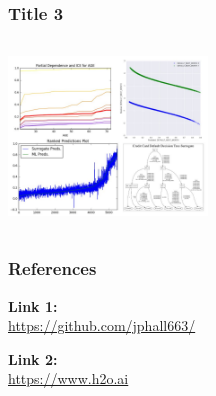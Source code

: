 \documentclass[11pt,
               		aspectratio=169,
               		hyperref={colorlinks}
               		]{beamer}
\begin{document}
		\subsection*{}
		
		\begin{frame}
		
			\frametitle{Title 3}		
			
			\begin{columns}
	
				\centering
				\includegraphics[height=120pt]{img/dummy.jpg}
				
				\scriptsize{\blindtext}
				
			\end{columns}
		
		\end{frame}


	\begin{frame}[t, allowframebreaks]
	
		\frametitle{References}	
		
			\textbf{Link 1:}\\
			\small{\url{https://github.com/jphall663/}}
			
			\vspace{10pt}
			
			\textbf{Link 2:}\\
			\small{\url{https://www.h2o.ai}}
			
		\framebreak		
		
		\printbibliography
		
	\end{frame}
\end{document}
